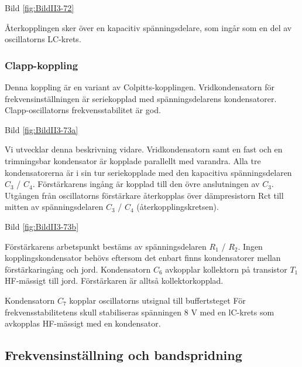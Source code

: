 Bild \ref{fig:BildII3-72}

Återkopplingen sker över en kapacitiv spänningsdelare, som ingår som
en del av oscillatorns LC-krets.

\subsubsection{Clapp-koppling}

Denna koppling är en variant av Colpitts-kopplingen. Vridkondensatorn
för frekvensinställningen är seriekopplad med spänningsdelarens
kondensatorer. Clapp-oscillatorns frekvensstabilitet är god.

Bild \ref{fig:BildII3-73a}

Vi utvecklar denna beskrivning vidare.  Vridkondensatorn samt en fast
och en trimningsbar kondensator är kopplade parallellt med
varandra. Alla tre kondensatorerna är i sin tur seriekopplade med den
kapacitiva spänningsdelaren \(C_3\) / \(C_4\).  Förstärkarens ingång
är kopplad till den övre anslutningen av \(C_3\). Utgången från
oscillatorns förstärkare återkopplas över dämpresistorn Rct till
mitten av spänningsdelaren \(C_3\) / \(C_4\) (återkopplingskretsen).

Bild \ref{fig:BildII3-73b}

Förstärkarens arbetspunkt bestäms av spänningsdelaren \(R_1\) /
\(R_2\). Ingen kopplingskondensator behövs eftersom det enbart finns
kondensatorer mellan förstärkaringång och jord.  Kondensatorn \(C_6\)
avkopplar kollektorn på transistor \(T_1\) HF-mässigt till
jord. Förstärkaren är alltså kollektorkopplad.

Kondensatorn \(C_7\) kopplar oscillatorns utsignal till buffertsteget
För frekvensstabilitetens skull stabiliseras spänningen 8 V med en
lC-krets som avkopplas HF-mässigt med en kondensator.

\subsection{Frekvensinställning och bandspridning}

